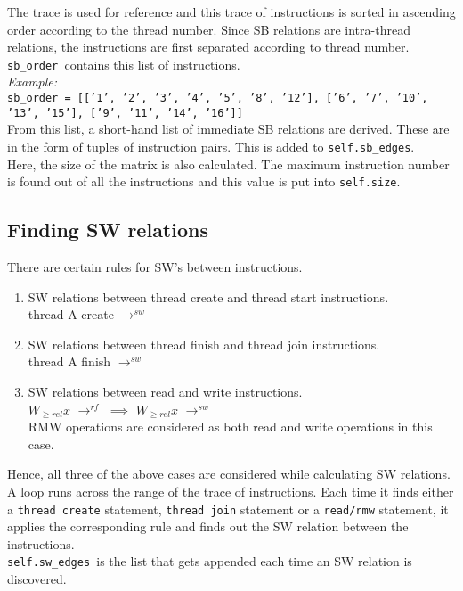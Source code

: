 \documentclass{article}
\newcommand{\var}[1]{\color{OliveGreen} \texttt{#1}\color{black}}
\newcommand{\varinfo}[1]{\scriptsize \texttt{#1} \normalsize}
\newcommand{\rf}[2]{{#1} {\color{Blue}$\rightarrow^{rf}$} \color{black}{#2}}
\newcommand{\sw}[2]{{#1} {\color{Blue}$\rightarrow^{sw}$} \color{black}{#2} }
\begin{document}
The trace is used for reference and this trace of instructions is sorted in ascending order according to the thread number. Since SB relations are intra-thread relations, the instructions are first separated according to thread number.\\
\var{sb\_order }contains this list of instructions.\\
\textit{Example:}\\
\var{sb\_order}\varinfo{ = [['1', '2', '3', '4', '5', '8', '12'], ['6', '7', '10', '13', '15'], ['9', '11', '14', '16']]}\\

From this list, a short-hand list of immediate SB relations are derived. These are in the form of tuples of instruction pairs. This is added to \var{self.sb\_edges}.\\

Here, the size of the matrix is also calculated. The maximum instruction number is found out of all the instructions and this value is put into \var{self.size}.

\subsection{Finding SW relations}
There are certain rules for SW's between instructions.
\begin{enumerate}
    \item SW relations between thread create and thread start instructions.\\
    \sw{thread A create}{thread A start}
    
    \item SW relations between thread finish and thread join instructions.\\
    \sw{thread A finish}{thread A join}
    
    \item SW relations between read and write instructions.\\
    \rf{$W_{\geq rel}x$}{$R_{\geq acq}x$} $\implies$ \sw{$W_{\geq rel}x$}{$R_{\geq acq}x$}\\
    RMW operations are considered as both read and write operations in this case.
    
\end{enumerate}

Hence, all three of the above cases are considered while calculating SW relations. A loop runs across the range of the trace of instructions. Each time it finds either a \texttt{thread create} statement, \texttt{thread join} statement or a \texttt{read/rmw} statement, it applies the corresponding rule and finds out the SW relation between the instructions.\\
\var{self.sw\_edges }is the list that gets appended each time an SW relation is discovered.
\end{document}
